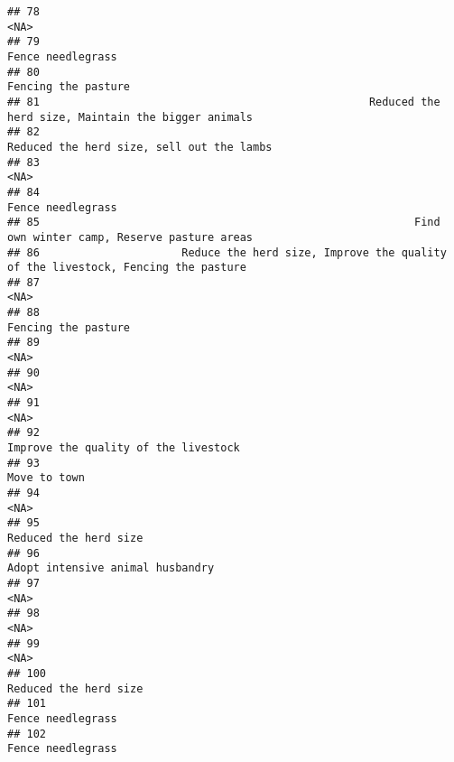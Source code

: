 \documentclass[
]{article}
\begin{document}
\begin{verbatim}
## 78                                                                                                 <NA>
## 79                                                                                    Fence needlegrass
## 80                                                                                  Fencing the pasture
## 81                                                   Reduced the herd size, Maintain the bigger animals
## 82                                                            Reduced the herd size, sell out the lambs
## 83                                                                                                 <NA>
## 84                                                                                    Fence needlegrass
## 85                                                          Find own winter camp, Reserve pasture areas
## 86                      Reduce the herd size, Improve the quality of the livestock, Fencing the pasture
## 87                                                                                                 <NA>
## 88                                                                                  Fencing the pasture
## 89                                                                                                 <NA>
## 90                                                                                                 <NA>
## 91                                                                                                 <NA>
## 92                                                                 Improve the quality of the livestock
## 93                                                                                         Move to town
## 94                                                                                                 <NA>
## 95                                                                                Reduced the herd size
## 96                                                                     Adopt intensive animal husbandry
## 97                                                                                                 <NA>
## 98                                                                                                 <NA>
## 99                                                                                                 <NA>
## 100                                                                               Reduced the herd size
## 101                                                                                   Fence needlegrass
## 102                                                                                   Fence needlegrass

\end{verbatim}
\end{document}
